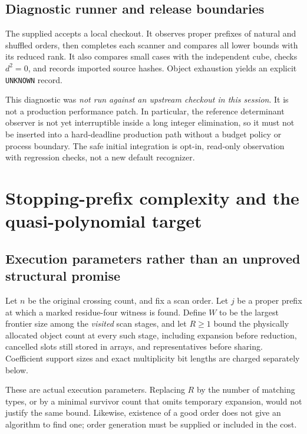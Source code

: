\documentclass[11pt]{article}
\theoremstyle{definition}
\theoremstyle{remark}
\newcommand{\code}[1]{\texttt{#1}}
\begin{document}
\subsection{Diagnostic runner and release boundaries}
The supplied  accepts a local
 checkout. It observes proper prefixes of natural and shuffled
orders, then completes each scanner and compares all lower bounds with its
reduced rank. It also compares small cases with the independent cube,
checks $d^2=0$, and records imported source hashes. Object exhaustion yields
an explicit \code{UNKNOWN} record.

This diagnostic was \emph{not run against an upstream checkout in this
session}. It is not a production performance patch. In particular, the
reference determinant observer is not yet interruptible inside a long
integer elimination, so it must not be inserted into a hard-deadline
production path without a budget policy or process boundary. The safe
initial integration is opt-in, read-only observation with regression checks,
not a new default recognizer.

\section{Stopping-prefix complexity and the quasi-polynomial target}
\label{sec:complexity}

\subsection{Execution parameters rather than an unproved structural promise}
Let $n$ be the original crossing count, and fix a scan order. Let $j$ be a
proper prefix at which a marked residue-four witness is found. Define $W$
to be the largest frontier size among the \emph{visited} scan stages, and
let $R\ge1$ bound the physically allocated object count at every such stage,
including expansion before reduction, cancelled slots still stored in
arrays, and representatives before sharing. Coefficient support sizes and
exact multiplicity bit lengths are charged separately below.

These are actual execution parameters. Replacing $R$ by the number of
matching types, or by a minimal survivor count that omits temporary
expansion, would not justify the same bound. Likewise, existence of a good
order does not give an algorithm to find one; order generation must be
supplied or included in the cost.
\end{document}
